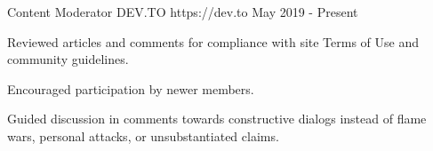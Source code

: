 

\begin{cventries}

  \cventry
    {Content Moderator} %
    {DEV.TO} %
    {https://dev.to} %
    {May 2019 - Present} %
    {
      \begin{cvitems} %
        \item {Reviewed articles and comments for compliance with site Terms of Use and community guidelines.}
        \item {Encouraged participation by newer members.}
        \item {Guided discussion in comments towards constructive dialogs instead of flame wars, personal attacks, or unsubstantiated claims.}
      \end{cvitems}
    }

\end{cventries}
